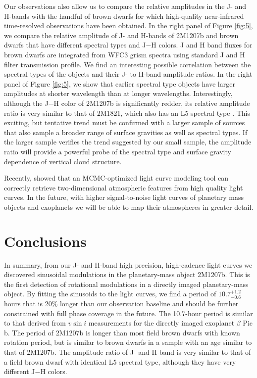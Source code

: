 \documentclass[apj]{emulateapj}
\newcommand{\bpic}{$\beta$ Pic}
\newcommand{\vsini}{$v\sin i$}
\newcommand{\revise}[1]{\textbf{{\color{cyan}{#1}}}}
\renewcommand{\revise}{}
\newcommand{\reviseTwo}[1]{\textbf{{\color{cyan}{#1}}}}
\renewcommand{\reviseTwo}{}
\newcommand{\period}{$10.7^{+1.2}_{-0.6}$}
\begin{document}
Our observations also allow us to compare the relative amplitudes in
the J- and H-bands with the handful of brown dwarfs for which
high-quality near-infrared time-resolved observations have been
obtained. In the right panel of Figure \ref{fig:5}, we compare the
relative amplitude of J- and H-bands of 2M1207b and brown dwarfs
\citep{Apai2013,Buenzli2012,Buenzli2015,Yang2015} that have different
spectral types and J$-$H colors.  J and H band fluxes for brown dwarfs
are integrated from WFC3 grism spectra using standard J and H filter
transmission profile. We find an interesting possible correlation
between the spectral types of the objects and their J- to H-band
amplitude ratios. In the right panel of Figure \ref{fig:5}, we show
that earlier spectral type objects have larger amplitudes at shorter
wavelength than at longer wavelengths. Interestingly, although the
J$-$H color of 2M1207b is significantly redder, its relative amplitude
ratio is very similar to that of 2M1821, which also has an L5 spectral
type \citep{Yang2015}.  This exciting, but tentative trend must be
confirmed with a larger sample of sources that also sample a broader
range of surface gravities as well as spectral types.  If the larger
sample verifies the trend suggested by our small sample, the amplitude
ratio will provide a powerful probe of the spectral type and surface
gravity dependence of vertical cloud structure.



\revise{Recently, \citet{Karalidi2015} showed that an MCMC-optimized
  light curve modeling tool can correctly retrieve two-dimensional
  atmospheric features from high quality light curves. In the future,
  with higher signal-to-noise light curves of planetary mass objects
  and exoplanets we will be able to map their atmospheres in greater
  detail.}



\section{Conclusions}
In summary, from our J- and H-band high precision, high-cadence light
curves we discovered sinusoidal modulations in the planetary-mass
object 2M1207b. This is the first detection of rotational modulations
in a directly imaged planetary-mass object.  \reviseTwo{By fitting the
  sinusoids to the light curves, we find a period of \period{} hours
  that is 20\% longer than our observation baseline and should be
  further constrained with full phase coverage in the future.} The
10.7-hour period is similar to that derived from \vsini{} 
measurements for the directly imaged exoplanet \bpic{} b.
\revise{The period of 2M1207b is longer than most field brown dwarfs
  with known rotation period,  but is similar to brown dwarfs
in a sample with an age similar to that of 2M1207b.} The amplitude ratio of J- and H-band is very
similar to that of a field brown dwarf with identical L5 spectral type, although they have
very different J$-$H colors.
\end{document}
